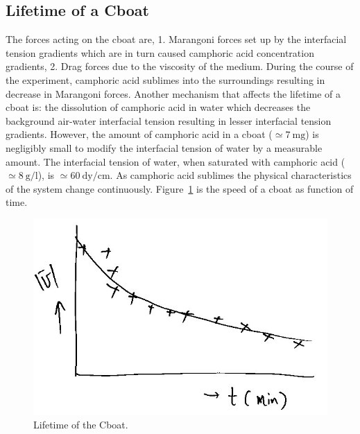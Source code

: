 \documentclass[aps,twocolumn, floatfix, superscriptaddress]{revtex4}
\begin{document}
\subsection{Lifetime of a Cboat}
\label{sec:lifetime}
The forces acting on the cboat are, 1. Marangoni forces set up by the interfacial tension gradients which are in turn caused camphoric acid concentration gradients, 2. Drag forces due to the viscosity of the medium. During the course of the experiment, camphoric acid sublimes into the surroundings resulting in decrease in Marangoni forces. Another mechanism that affects the lifetime of a cboat is: the dissolution of camphoric acid in water which decreases the background air-water interfacial tension resulting in lesser interfacial tension gradients. However, the amount of camphoric acid in a cboat ($\simeq 7\ \mathrm{mg}$) is negligibly small to modify the interfacial tension of water by a measurable amount. The interfacial tension of water, when saturated with camphoric acid ($\simeq 8\ \mathrm{g/l}$), is $\simeq 60\ \mathrm{dy/cm}$. As camphoric acid sublimes the physical characteristics of the system change continuously. Figure~\ref{fig:lifetime} is the speed of a cboat as function of time. 
\begin{figure}[ht]
    \begin{center}
       \includegraphics[scale=0.25]{figure4.jpg}
    \end{center}
    \caption{Lifetime of the Cboat.}
    \label{fig:lifetime}
\end{figure}
\end{document}
